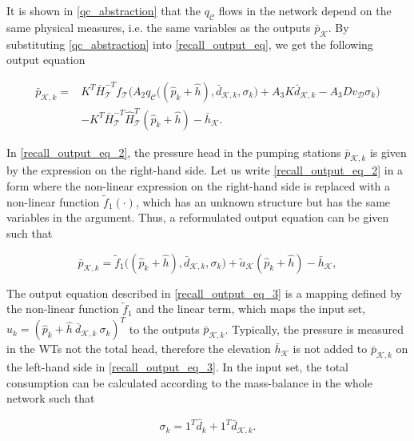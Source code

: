 It is shown in \eqref{qc_abstraction} that the $q_\mathcal{C}$ flows in the network depend on the same physical measures, i.e. the same variables as the outputs $\bar{p}_{\mathcal{K}}$. By substituting \eqref{qc_abstraction} into \eqref{recall_output_eq}, we get the following output equation

\vspace{-4mm}
\begin{align}
  \label{recall_output_eq_2}
      \bar{p}_{\mathcal{K},k}  = & \nonumber K^T \bar{H}^{-T}_{\mathcal{T}}f_{\mathcal{T}} \big (A_2 q_{\mathcal{C}}\big ((\hat{p}_k + \hat{h}),\bar{d}_{\mathcal{K},k}, \sigma_k \big) + A_3 K \bar{d}_{\mathcal{K},k} - A_3 D v_{\mathcal{D}} \sigma_k \big)   \\ &  - K^T\bar{H}^{-T}_{\mathcal{T}}\hat{H}^{T}_{\mathcal{T}} (\hat{p}_k + \hat{h}) - \bar{h}_{\mathcal{K}} .
\end{align}

\vspace{-4mm}
In \eqref{recall_output_eq_2}, the pressure head in the pumping stations $\bar{p}_{\mathcal{K},k}$ is given by the expression on the right-hand side. Let us write \eqref{recall_output_eq_2} in a form where the non-linear expression on the right-hand side is replaced with a non-linear function $\tilde{f}_1(\cdot)$, which has an unknown structure but has the same variables in the argument. Thus, a reformulated output equation can be given such that 

 \begin{equation}
  \label{recall_output_eq_3}
     \bar{p}_{\mathcal{K},k}  = \tilde{f}_1 \big((\hat{p}_k + \hat{h}),\bar{d}_{\mathcal{K},k}, \sigma_k\big) + \tilde{a}_{\mathcal{K}} (\hat{p}_k + \hat{h}) - \bar{h}_{\mathcal{K}}, 
\end{equation} 

The output equation described in \eqref{recall_output_eq_3} is a mapping defined by the non-linear function $\tilde{f}_1$ and the linear term, which maps the input set, $u_k = ( \hat{p}_k\!+\!\hat{h} \ \bar{d}_{\mathcal{K},k} \ \sigma_k )^T$ to the outputs $\bar{p}_{\mathcal{K},k} $. Typically, the pressure is measured in the WTs not the total head, therefore the elevation $\bar{h}_{\mathcal{K}}$ is not added to $\bar{p}_{\mathcal{K},k}$ on the left-hand side in \eqref{recall_output_eq_3}. In the input set, the total consumption can be calculated according to the mass-balance in the whole network such that

\begin{equation}
\label{massbalance_identification}
 \sigma_k = 1^T \hat{d}_k + 1^T \bar{d}_{\mathcal{K},k}.
\end{equation}

